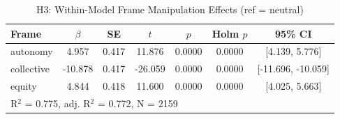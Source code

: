 \begin{table}[ht]
\centering
\caption{H3: Within-Model Frame Manipulation Effects (ref = neutral)}
\label{tab:h3-frame-manipulation}
\begin{tabular}{lcccccc}
\toprule
Frame & $\beta$ & SE & $t$ & $p$ & Holm $p$ & 95\% CI \\
\midrule
autonomy & 4.957 & 0.417 & 11.876 & 0.0000 & 0.0000 & [4.139, 5.776] \\
collective & -10.878 & 0.417 & -26.059 & 0.0000 & 0.0000 & [-11.696, -10.059] \\
equity & 4.844 & 0.418 & 11.600 & 0.0000 & 0.0000 & [4.025, 5.663] \\
\midrule
\multicolumn{7}{l}{R$^2$ = 0.775, adj. R$^2$ = 0.772, N = 2159} \\
\bottomrule
\end{tabular}
\end{table}
